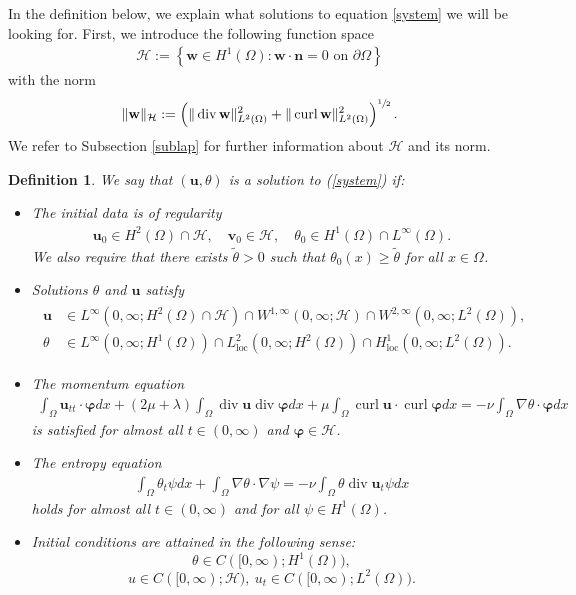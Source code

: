 \documentclass[11pt]{article}
\numberwithin{equation}{section}
\newtheorem{defi}{Definition}[section]
\theoremstyle{plain}
\newcommand\bb[1]{\mathbf{#1}}
\newcommand{\tn}{\Omega}
\newcommand{\io}{\int_{\Omega}}
\newcommand{\htwo}{H^2(\Omega)}
\renewcommand{\hom}{H^1(\tn)}
\newcommand{\ld}{L^2(\Omega)}
\newcommand{\loc}{\operatorname{loc}}
\newcommand{\sul}{\sfrac{1}{2}}
\renewcommand{\div}{\operatorname{div}}
\DeclareMathOperator{\curl}{curl}
\let \phi\varphi
\newcommand{\wspnd}{2\mu+\lambda}
\newcommand{\bu}{\bb{u}}
\newcommand{\bs}[1]{\boldsymbol{#1}}
\renewcommand{\H}{\mathcal{H}}
\begin{document}
In the definition below, we explain what solutions to equation \eqref{system} we will be looking for. First, we introduce the following function space
\begin{align*}
\H:=\left\{\bb w\in\hom\colon \bb w\cdot\bb n=0\textrm{ on }\partial\Omega\right\}
\end{align*}
with the norm
\begin{align}\label{defnorm}
\|\bb w\|_{\H}:=\left(\|\div\bb w\|_{\ld}^2+\|\curl\bb w\|_{\ld}^2\right)^{\sul}.
\end{align}
We refer to Subsection \ref{sublap} for further information about $\H$ and its norm.
\begin{defi}\label{soldef}
We say that $(\bb u,\theta)$ is a solution to (\ref{system}) if:
\begin{itemize}
\item The initial data is of regularity
\begin{align*}
\bb u_0\in \htwo\cap\H,\quad \bb v_0\in\H,\quad \theta_0\in\hom\cap L^{\infty}(\tn).
\end{align*}
We also require that there exists $\tilde{\theta}>0$ such that $\theta_0(x)\geq\tilde{\theta}$ for all $x\in\tn$.
\item Solutions $\theta$ and $\bu$ satisfy
\begin{align}\label{reggl}
\begin{split}
\bu&\in L^{\infty}(0,\infty;\htwo\cap\H)\cap W^{1,\infty}(0,\infty;\H)\cap W^{2,\infty}(0,\infty;\ld),\\
\theta&\in L^{\infty}(0,\infty;\hom)\cap L^2_{\loc}(0,\infty;\htwo)\cap H^1_{\loc}(0,\infty; \ld).
\end{split}
\end{align}
\item The momentum equation
\begin{align}\label{defmom}
 \io\bb u_{tt}\cdot\bs\phi dx+(\wspnd)\io\div\bb u\div\bs\phi dx+\mu\io\curl\bb u\cdot\curl\bs\phi dx =-\nu\io\nabla\theta\cdot\bs\phi dx
\end{align}
is satisfied for almost all $t\in (0,\infty)$ and $\bs\phi\in\H$.
\item The entropy equation
\begin{align}\label{defheat}
\io\theta_t\psi dx+\io\nabla\theta\cdot\nabla\psi=-\nu\io\theta \div\bb u_{t}\psi dx
\end{align}
holds for almost all $t\in (0,\infty)$ and for all $\psi\in\hom$.
\item Initial conditions are attained in the following sense:
\[
\theta \in C([0,\infty);\hom),
\]
\[
u\in C([0,\infty);\H),\ u_t \in C([0,\infty);\ld).
\]
\end{itemize}
\end{defi}
\end{document}

